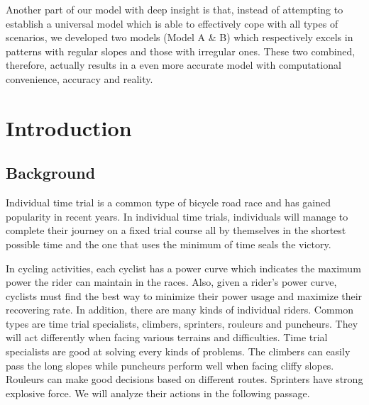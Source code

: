 \documentclass{article}
\begin{document}
	Another part of our model with deep insight is that, instead of attempting to establish a universal model which is able to effectively cope with all types of scenarios, we developed two models (Model A \& B) which respectively excels in patterns with regular slopes and those with irregular ones. These two combined, therefore, actually results in a even more accurate model with computational convenience, accuracy and reality.




    \clearpage
    \newpage
    \pagestyle{empty}
    \setlength{\headheight}{12pt}
    \renewcommand{\headrulewidth}{0.5pt}
    \renewcommand{\footrulewidth}{0.0pt}
    \pagestyle{fancy}
    \cfoot{}
    \lfoot{}
    \rfoot{}

    \clearpage
    \thispagestyle{empty}
    \tableofcontents
    \newpage
    \pagestyle{fancy}
    \setcounter{page}{1}

	\newpage
	\section{Introduction}
		\subsection{Background}
		Individual time trial is a common type of bicycle road race and has gained popularity in recent years. In individual time trials, individuals will manage to complete their journey on a fixed trial course all by themselves in the shortest possible time and the one that uses the minimum of time seals the victory.

		In cycling activities, each cyclist has a power curve which indicates the maximum power the rider can maintain in the races. Also, given a rider's power curve, cyclists must find the best way to minimize their power usage and maximize their recovering rate. In addition, there are many kinds of individual riders. Common types are time trial specialists, climbers, sprinters, rouleurs and puncheurs. They will act differently when facing various terrains and difficulties. Time trial specialists are good at solving every kinds of problems. The climbers can easily pass the long slopes while puncheurs perform well when facing cliffy slopes. Rouleurs can make good decisions based on different routes. Sprinters have strong explosive force. We will analyze their actions in the following passage.
\end{document}
